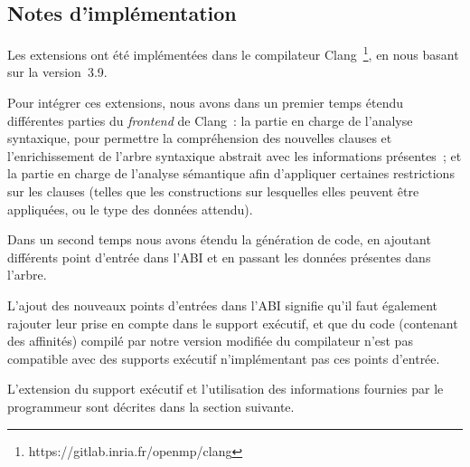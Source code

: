 \subsection{Notes d'implémentation}

Les extensions ont été implémentées dans le compilateur Clang~\footnote{https://gitlab.inria.fr/openmp/clang}, en nous basant sur la version~3.9.

Pour intégrer ces extensions, nous avons dans un premier temps étendu différentes parties du \emph{frontend} de Clang~: la partie en charge de l'analyse syntaxique, pour permettre la compréhension des nouvelles clauses et l'enrichissement de l'arbre syntaxique abstrait avec les informations présentes~;
et la partie en charge de l'analyse sémantique afin d'appliquer certaines restrictions sur les clauses (telles que les constructions sur lesquelles elles peuvent être appliquées, ou le type des données attendu).

Dans un second temps nous avons étendu la génération de code, en ajoutant différents point d'entrée dans l'ABI et en passant les données présentes dans l'arbre.

L'ajout des nouveaux points d'entrées dans l'ABI signifie qu'il faut également rajouter leur prise en compte dans le support exécutif, et que du code (contenant des affinités) compilé par notre version modifiée du compilateur n'est pas compatible avec des supports exécutif n'implémentant pas ces points d'entrée.


L'extension du support exécutif et l'utilisation des informations fournies par le programmeur sont décrites dans la section suivante.
